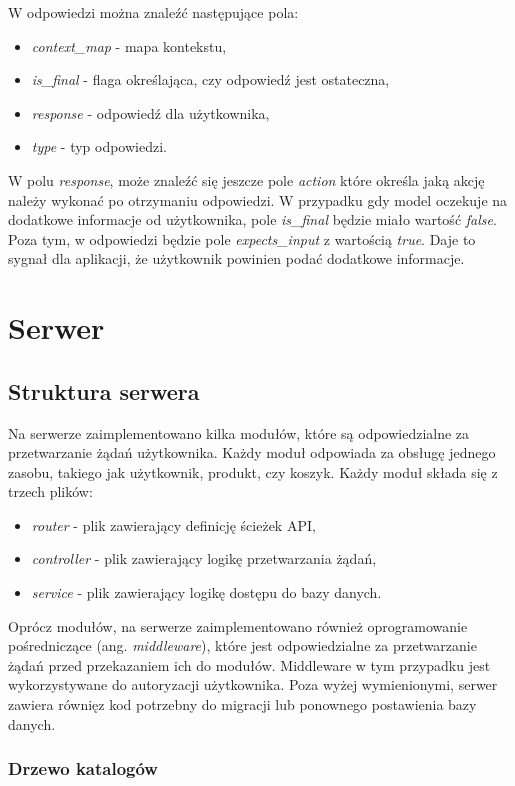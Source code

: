 W odpowiedzi można znaleźć następujące pola:
\begin{itemize}
    \item \textit{context\_map} - mapa kontekstu,
    \item \textit{is\_final} - flaga określająca, czy odpowiedź jest ostateczna,
    \item \textit{response} - odpowiedź dla użytkownika,
    \item \textit{type} - typ odpowiedzi.
\end{itemize}
W polu \textit{response}, może znaleźć się jeszcze pole \textit{action} które określa jaką akcję należy wykonać po otrzymaniu odpowiedzi.
W przypadku gdy model oczekuje na dodatkowe informacje od użytkownika, pole \textit{is\_final} będzie miało wartość \textit{false}. Poza tym, w odpowiedzi będzie pole \textit{expects\_input} z wartością \textit{true}. Daje to sygnał dla aplikacji, że użytkownik powinien podać dodatkowe informacje.

\section{Serwer}

\subsection{Struktura serwera}
Na serwerze zaimplementowano kilka modułów, które są odpowiedzialne za przetwarzanie żądań użytkownika. Każdy moduł odpowiada za obsługę jednego zasobu, takiego jak użytkownik, produkt, czy koszyk. Każdy moduł składa się z trzech plików:
\begin{itemize}
    \item \textit{router} - plik zawierający definicję ścieżek API,
    \item \textit{controller} - plik zawierający logikę przetwarzania żądań,
    \item \textit{service} - plik zawierający logikę dostępu do bazy danych.
\end{itemize}

Oprócz modułów, na serwerze zaimplementowano również oprogramowanie pośredniczące (ang. \textit{middleware}), które jest odpowiedzialne za przetwarzanie żądań przed przekazaniem ich do modułów. Middleware w tym przypadku jest wykorzystywane do autoryzacji użytkownika.
Poza wyżej wymienionymi, serwer zawiera równięz kod potrzebny do migracji lub ponownego postawienia bazy danych. 

\subsubsection{Drzewo katalogów}

